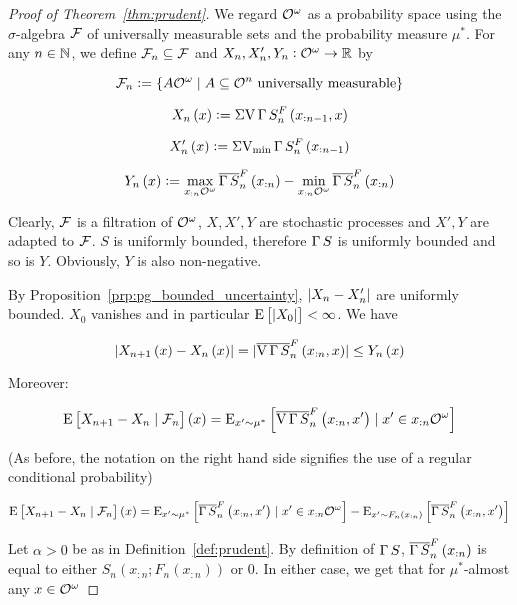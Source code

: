 \begin{proof}[Proof of Theorem~\ref{thm:prudent}]

We regard ${\mathcal{O}^\omega}$ as a probability space using the ${\sigma}$-algebra $\mathcal{F}$ of universally measurable sets and the probability measure ${\mu^*}$. For any ${n \in \mathbb{N}}$, we define ${\mathcal{F}_n \subseteq \mathcal{F}}$ and $X_n,X'_n,Y_n: \mathcal{O}^\omega \rightarrow \mathbb{R}$ by 

$$\mathcal{F}_n := \{A\mathcal{O}^\omega \mid A \subseteq \mathcal{O}^n \text{ universally measurable}\}$$

$$X_n\left(x\right):= \operatorname{\Sigma V} \operatorname{\Gamma}{S}^F_{n}\left(x_{:n-1},x\right)$$

$$X'_n\left(x\right):= \operatorname{\Sigma V_{\min}} \operatorname{\Gamma}{S}^F_{n}\left(x_{:n-1}\right)$$

$$Y_n\left(x\right):=\max_{x_{:n}\mathcal{O}^\omega} \overline{\operatorname{\Gamma}{S}}^F_{n}\left(x_{:n}\right) - \min_{x_{:n}\mathcal{O}^\omega} \overline{\operatorname{\Gamma}{S}}^F_{n}\left(x_{:n}\right)$$

Clearly, ${\mathcal{F}}$ is a filtration of ${\mathcal{O}^\omega}$, ${X,X',Y}$ are stochastic processes and ${X',Y}$ are adapted to ${\mathcal{F}}$. ${S}$ is uniformly bounded, therefore ${\operatorname{\Gamma}{S}}$  is uniformly bounded and so is ${Y}$. Obviously, ${Y}$ is also non-negative.

By Proposition~\ref{prp:pg_bounded_uncertainty}, ${\lvert X_n-X'_n \rvert}$ are uniformly bounded. ${X_0}$ vanishes and in particular ${\operatorname{E}\left[\lvert X_0 \rvert\right] < \infty}$. We have

$$\lvert X_{n+1}\left(x\right)-X_n\left(x\right) \rvert = \lvert \overline{\operatorname{V}{\operatorname{\Gamma}{S}}}_{n}^F\left(x_{:n},x\right) \rvert \leq Y_n\left(x\right)$$

Moreover:

$$\operatorname{E}\left[X_{n+1} - X_n \mid \mathcal{F}_n\right]\left(x\right) = \operatorname{E}_{x' \sim \mu^*}\left[\overline{\operatorname{V}{\operatorname{\Gamma}{S}}}_{n}^F\left(x_{:n},x'\right) \mid x' \in x_{:n}\mathcal{O}^\omega\right]$$

(As before, the notation on the right hand side signifies the use of a regular conditional probability)

$$\operatorname{E}\left[X_{n+1} - X_n \mid \mathcal{F}_n\right]\left(x\right) = \operatorname{E}_{x' \sim \mu^*}\left[\overline{\operatorname{\Gamma}{S}}_{n}^F\left(x_{:n},x'\right) \mid x' \in x_{:n}\mathcal{O}^\omega\right] - \operatorname{E}_{x' \sim F_n\left(x_{:n}\right)}\left[\overline{\operatorname{\Gamma}{S}}_{n}^F\left(x_{:n},x'\right)\right]$$

Let $\alpha > 0$ be as in Definition~\ref{def:prudent}. By definition of $\operatorname{\Gamma}{S}$, $\overline{\operatorname{\Gamma}{S}}_{n}^F\left(x_{:n}\right)$ is equal to either $S_n\left(x_{:n};F_n\left(x_{:n}\right)\right)$ or 0. In either case, we get that for $\mu^*$-almost any $x \in \mathcal{O}^\omega$


\end{proof}
